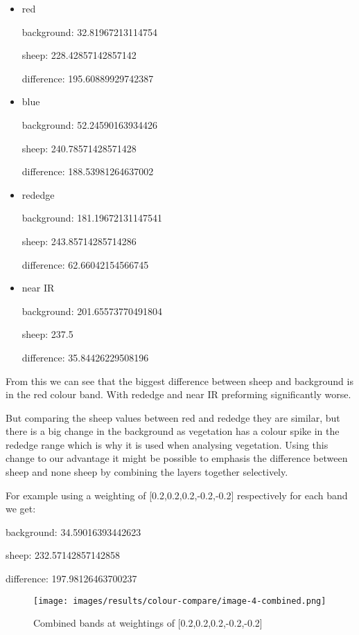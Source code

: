 \begin{itemize}
    \item red
    
background: 32.81967213114754

sheep: 228.42857142857142

difference: 195.60889929742387

\item blue

background: 52.24590163934426

sheep: 240.78571428571428

difference: 188.53981264637002

\item rededge

background: 181.19672131147541

sheep: 243.85714285714286

difference: 62.66042154566745

\item near IR

background: 201.65573770491804

sheep: 237.5

difference: 35.84426229508196

\end{itemize}

From this we can see that the biggest difference between sheep and background is in the red colour band. With rededge and near IR preforming significantly worse.

But comparing the sheep values between red and rededge they are similar, but there is a big change in the background as vegetation has a colour spike in the rededge range which is why it is used when analysing vegetation. Using this change to our advantage it might be possible to emphasis the difference between sheep and none sheep by combining the layers together selectively.

For example using a weighting of [0.2,0.2,0.2,-0.2,-0.2] respectively for each band we get:

background: 34.59016393442623

sheep: 232.57142857142858

difference: 197.98126463700237

\begin{figure}[H]
    \centering
    \texttt{[image: images/results/colour-compare/image-4-combined.png]}
    \caption{Combined bands at weightings of [0.2,0.2,0.2,-0.2,-0.2]}
    \label{fig:colour-bands-combined}
\end{figure}

